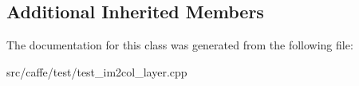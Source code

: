 \subsection*{Additional Inherited Members}


The documentation for this class was generated from the following file\+:\begin{DoxyCompactItemize}
\item 
src/caffe/test/test\+\_\+im2col\+\_\+layer.\+cpp\end{DoxyCompactItemize}
